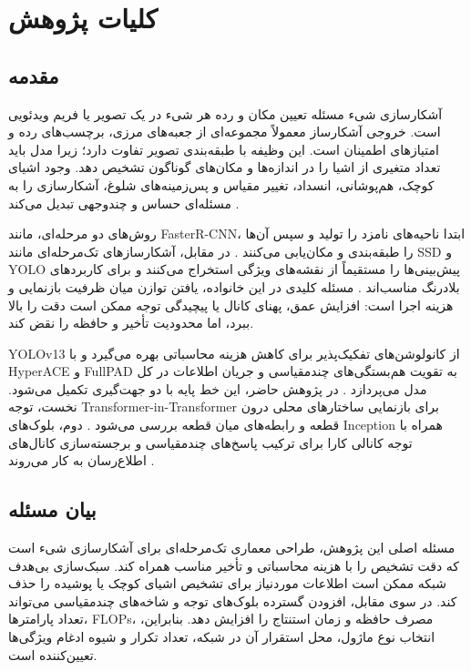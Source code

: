 \chapter{کلیات پژوهش}

\section{مقدمه}
آشکارسازی شیء مسئله تعیین مکان و رده هر شیء در یک تصویر یا فریم ویدئویی است. خروجی آشکارساز معمولاً مجموعه‌ای از جعبه‌های مرزی، برچسب‌های رده و امتیازهای اطمینان است. این وظیفه با طبقه‌بندی تصویر تفاوت دارد؛ زیرا مدل باید تعداد متغیری از اشیا را در اندازه‌ها و مکان‌های گوناگون تشخیص دهد. وجود اشیای کوچک، هم‌پوشانی، انسداد، تغییر مقیاس و پس‌زمینه‌های شلوغ، آشکارسازی را به مسئله‌ای حساس و چندوجهی تبدیل می‌کند \cite{lin2014coco}.

روش‌های دو مرحله‌ای، مانند FasterR-CNN، ابتدا ناحیه‌های نامزد را تولید و سپس آن‌ها را طبقه‌بندی و مکان‌یابی می‌کنند \cite{ren2015faster}. در مقابل، آشکارسازهای تک‌مرحله‌ای مانند SSD و YOLO پیش‌بینی‌ها را مستقیماً از نقشه‌های ویژگی استخراج می‌کنند و برای کاربردهای بلادرنگ مناسب‌اند \cite{liu2016ssd,redmon2016yolo}. مسئله کلیدی در این خانواده، یافتن توازن میان ظرفیت بازنمایی و هزینه اجرا است: افزایش عمق، پهنای کانال یا پیچیدگی توجه ممکن است دقت را بالا ببرد، اما محدودیت تأخیر و حافظه را نقض کند.

YOLOv13 از کانولوشن‌های تفکیک‌پذیر برای کاهش هزینه محاسباتی بهره می‌گیرد و با HyperACE و FullPAD به تقویت هم‌بستگی‌های چندمقیاسی و جریان اطلاعات در کل مدل می‌پردازد \cite{lei2025yolov13}. در پژوهش حاضر، این خط پایه با دو جهت‌گیری تکمیل می‌شود. نخست، توجه Transformer-in-Transformer برای بازنمایی ساختارهای محلی درون قطعه و رابطه‌های میان قطعه بررسی می‌شود \cite{han2021tnt}. دوم، بلوک‌های Inception همراه با توجه کانالی کارا برای ترکیب پاسخ‌های چندمقیاسی و برجسته‌سازی کانال‌های اطلاع‌رسان به کار می‌روند \cite{szegedy2015inception,wang2020eca}.

\section{بیان مسئله}
مسئله اصلی این پژوهش، طراحی معماری تک‌مرحله‌ای برای آشکارسازی شیء است که دقت تشخیص را با هزینه محاسباتی و تأخیر مناسب همراه کند. سبک‌سازی بی‌هدف شبکه ممکن است اطلاعات موردنیاز برای تشخیص اشیای کوچک یا پوشیده را حذف کند. در سوی مقابل، افزودن گسترده بلوک‌های توجه و شاخه‌های چندمقیاسی می‌تواند تعداد پارامترها، FLOPs، مصرف حافظه و زمان استنتاج را افزایش دهد. بنابراین، انتخاب نوع ماژول، محل استقرار آن در شبکه، تعداد تکرار و شیوه ادغام ویژگی‌ها تعیین‌کننده است.

